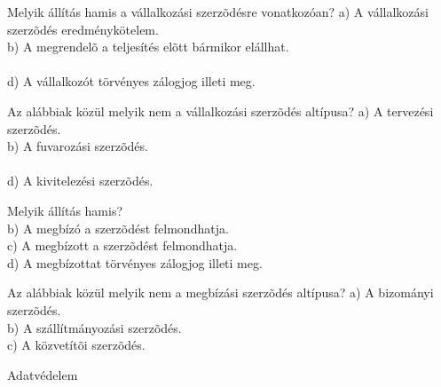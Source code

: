 \begin{frame}

\begin{tcolorbox}[title={172. Kérdés}]
Melyik állítás hamis a vállalkozási szerzõdésre vonatkozóan?
\tcblower
a) A vállalkozási szerzõdés eredménykötelem.\\
b) A megrendelõ a teljesítés elõtt bármikor elállhat.\\
\\
d) A vállalkozót törvényes zálogjog illeti meg.
\end{tcolorbox}

\begin{tcolorbox}[title={173. Kérdés}]
Az alábbiak közül melyik nem a vállalkozási szerzõdés altípusa?
\tcblower
a) A tervezési szerzõdés.\\
b) A fuvarozási szerzõdés.\\
\\
d) A kivitelezési szerzõdés.
\end{tcolorbox}

\begin{tcolorbox}[title={174. Kérdés}]
Melyik állítás hamis?
\tcblower
{}\\
b) A megbízó a szerzõdést felmondhatja.\\
c) A megbízott a szerzõdést felmondhatja.\\
d) A megbízottat törvényes zálogjog illeti meg.
\end{tcolorbox}

\begin{tcolorbox}[title={175. Kérdés}]
Az alábbiak közül melyik nem a megbízási szerzõdés altípusa?
\tcblower
a) A bizományi szerzõdés.\\
b) A szállítmányozási szerzõdés.\\
c) A közvetítõi szerzõdés.\\
\end{tcolorbox}

\end{frame}

\begin{frame}[plain]
\begin{tcolorbox}[center, colback={myyellow}, coltext={black}, colframe={myyellow}]
    { Adatvédelem}\\
\end{tcolorbox}
\end{frame}

